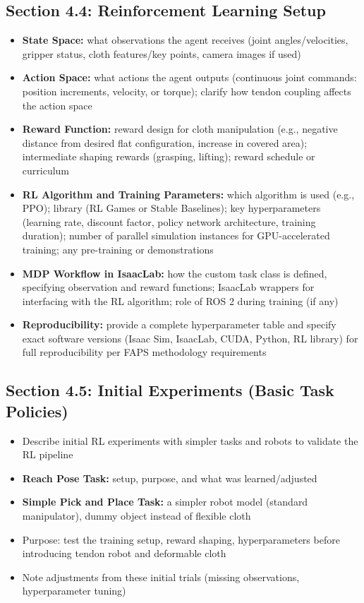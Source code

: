 \subsection{Section 4.4: Reinforcement Learning Setup}
\begin{itemize}
    \item \textbf{State Space:} what observations the agent receives (joint angles/velocities, gripper status, cloth features/key points, camera images if used)
    \item \textbf{Action Space:} what actions the agent outputs (continuous joint commands: position increments, velocity, or torque); clarify how tendon coupling affects the action space
    \item \textbf{Reward Function:} reward design for cloth manipulation (e.g., negative distance from desired flat configuration, increase in covered area); intermediate shaping rewards (grasping, lifting); reward schedule or curriculum
    \item \textbf{RL Algorithm and Training Parameters:} which algorithm is used (e.g., PPO); library (RL Games or Stable Baselines); key hyperparameters (learning rate, discount factor, policy network architecture, training duration); number of parallel simulation instances for GPU-accelerated training; any pre-training or demonstrations
    \item \textbf{MDP Workflow in IsaacLab:} how the custom task class is defined, specifying observation and reward functions; IsaacLab wrappers for interfacing with the RL algorithm; role of ROS 2 during training (if any)
    \item \textbf{Reproducibility:} provide a complete hyperparameter table and specify exact software versions (Isaac Sim, IsaacLab, CUDA, Python, RL library) for full reproducibility per FAPS methodology requirements
\end{itemize}

\subsection{Section 4.5: Initial Experiments (Basic Task Policies)}
\begin{itemize}
    \item Describe initial RL experiments with simpler tasks and robots to validate the RL pipeline
    \item \textbf{Reach Pose Task:} setup, purpose, and what was learned/adjusted
    \item \textbf{Simple Pick and Place Task:} a simpler robot model (standard manipulator), dummy object instead of flexible cloth
    \item Purpose: test the training setup, reward shaping, hyperparameters before introducing tendon robot and deformable cloth
    \item Note adjustments from these initial trials (missing observations, hyperparameter tuning)
\end{itemize}

